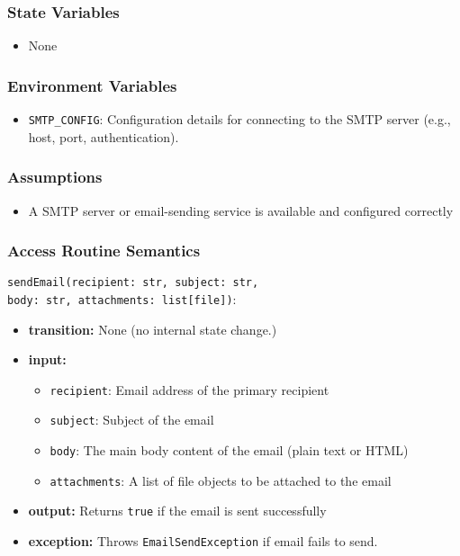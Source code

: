 \documentclass[12pt, titlepage]{article}
\begin{document}
\subsubsection{State Variables}

\begin{itemize}
    \item None
\end{itemize}

\subsubsection{Environment Variables}

\begin{itemize}
    \item \texttt{SMTP\_CONFIG}: Configuration details for connecting to the SMTP server (e.g., host, port, authentication).
\end{itemize}

\subsubsection{Assumptions}

\begin{itemize}
    \item A SMTP server or email-sending service is available and configured correctly
\end{itemize}

\subsubsection{Access Routine Semantics}

\noindent \texttt{sendEmail(recipient: str, subject: str, \\
    body: str, attachments: list[file])}:
\begin{itemize}
    \item \textbf{transition:} None (no internal state change.)
    \item \textbf{input:} 
    \begin{itemize}
        \item \texttt{recipient}: Email address of the primary recipient
        \item \texttt{subject}: Subject of the email
        \item \texttt{body}: The main body content of the email (plain text or HTML)
        \item \texttt{attachments}: A list of file objects to be attached to the email
    \end{itemize}
    \item \textbf{output:} Returns \texttt{true} if the email is sent successfully
    \item \textbf{exception:} Throws \texttt{EmailSendException} if email fails to send.
\end{itemize}
\end{document}

